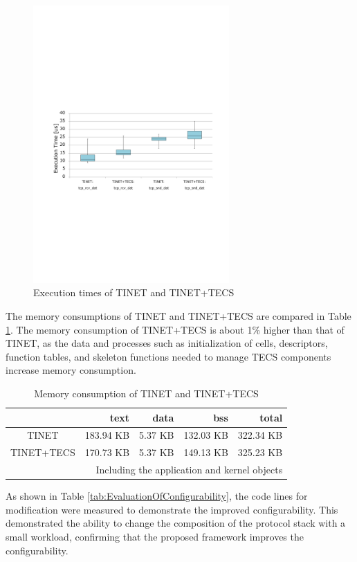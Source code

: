 \documentclass[JIP]{ipsj_v2/UTF8/ipsj}
\begin{document}
\begin{figure}[t]
    \centering
    \includegraphics[width=7.5cm,clip]{figure/EvaluationOfExecutionTime.pdf}
    \caption{Execution times of TINET and TINET+TECS}
    \label{fig:EvaluationOfExecutionTime}
\end{figure}

The memory consumptions of TINET and TINET+TECS are compared in Table \ref{tab:EvaluationOfMemoryConsumption}.
The memory consumption of TINET+TECS is about 1\% higher than that of TINET, as the data and processes such as initialization of cells, descriptors, function tables, and skeleton functions needed to manage TECS components increase memory consumption.

\begin{table}[t]
    \centering
    \caption{Memory consumption of TINET and TINET+TECS}
    \begin{tabular}{c|r|r|r|r}
        \hline\hline
                    &   text       &  data    &   bss      &  total     \\ \hline
        TINET       &   183.94 KB  &  5.37 KB &  132.03 KB &  322.34 KB \\
        TINET+TECS  &   170.73 KB  &  5.37 KB &  149.13 KB &  325.23 KB \\
        \hline
        \multicolumn{5}{r}{Including the application and kernel objects}
    \end{tabular}
    \label{tab:EvaluationOfMemoryConsumption}
\end{table}

As shown in Table \ref{tab:EvaluationOfConfigurability}, the code lines for modification were measured to demonstrate the improved configurability.
This demonstrated the ability to change the composition of the protocol stack with a small workload, confirming that the proposed framework improves the configurability.
\end{document}
